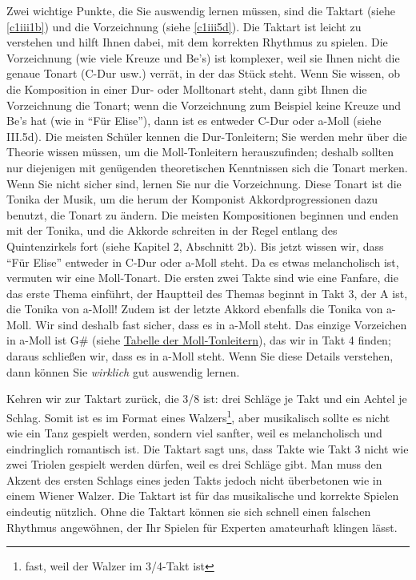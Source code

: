 Zwei wichtige Punkte, die Sie auswendig lernen müssen, sind die Taktart (siehe \hyperref[c1iii1b]{\autoref{c1iii1b}}) und die Vorzeichnung (siehe \hyperref[c1iii5d]{\autoref{c1iii5d}}).
Die Taktart ist leicht zu verstehen und hilft Ihnen dabei, mit dem korrekten Rhythmus zu spielen.
Die Vorzeichnung (wie viele Kreuze und Be's) ist komplexer, weil sie Ihnen nicht die genaue Tonart (C-Dur usw.) verrät, in der das Stück steht.
Wenn Sie wissen, ob die Komposition in einer Dur- oder Molltonart steht, dann gibt Ihnen die Vorzeichnung die Tonart; wenn die Vorzeichnung zum Beispiel keine Kreuze und Be's hat (wie in \enquote{Für Elise}), dann  ist es entweder C-Dur oder a-Moll (siehe III.5d).
Die meisten Schüler kennen die Dur-Tonleitern; Sie werden mehr über die Theorie wissen müssen, um die Moll-Tonleitern herauszufinden;
deshalb sollten nur diejenigen mit genügenden theoretischen Kenntnissen sich die Tonart merken.
Wenn Sie nicht sicher sind, lernen Sie nur die Vorzeichnung.
Diese Tonart ist die Tonika der Musik, um die herum der Komponist Akkordprogressionen dazu benutzt, die Tonart zu ändern.
Die meisten Kompositionen beginnen und enden mit der Tonika, und die Akkorde schreiten in der Regel entlang des Quintenzirkels fort (siehe Kapitel 2, Abschnitt 2b). Bis jetzt wissen wir, dass \enquote{Für Elise} entweder in C-Dur oder a-Moll steht.
Da es etwas melancholisch ist, vermuten wir eine Moll-Tonart.
Die ersten zwei Takte sind wie eine Fanfare, die das erste Thema einführt, der Hauptteil des Themas beginnt in Takt 3, der A ist, die Tonika von a-Moll!
Zudem ist der letzte Akkord ebenfalls die Tonika von a-Moll.
Wir sind deshalb fast sicher, dass es in a-Moll steht.
Das einzige Vorzeichen in a-Moll ist G\# (siehe \hyperref[tablemoll]{Tabelle der Moll-Tonleitern}), das wir in Takt 4 finden; daraus schließen wir, dass es in a-Moll steht.
Wenn Sie diese Details verstehen, dann können Sie \textit{wirklich} gut auswendig lernen.

Kehren wir zur Taktart zurück, die 3/8 ist: drei Schläge je Takt und ein Achtel je Schlag.
Somit ist es im Format eines Walzers\footnote{fast, weil der Walzer im 3/4-Takt ist}, aber musikalisch sollte es nicht wie ein Tanz gespielt werden, sondern viel sanfter, weil es melancholisch und eindringlich romantisch ist.
Die Taktart sagt uns, dass Takte wie Takt 3 nicht wie zwei Triolen gespielt werden dürfen, weil es drei Schläge gibt.
Man muss den Akzent des ersten Schlags eines jeden Takts jedoch nicht überbetonen wie in einem Wiener Walzer.
Die Taktart ist für das musikalische und korrekte Spielen eindeutig  nützlich.
Ohne die Taktart können sie sich schnell einen falschen Rhythmus angewöhnen, der Ihr Spielen für Experten amateurhaft klingen lässt.

